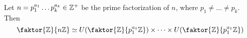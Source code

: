 \begin{corollary}
  Let $n=p_1^{a_1} \dots p_k^{a_k} \in \mathbb{Z}^+$ be the prime factorization of
  $n$, where  $p_1 \neq \dots \neq p_k$. Then
  \begin{equation*}
    \faktor{\Z}{n\Z} \simeq U(\faktor{\Z}{p_1^{a_1}\Z}) \times \dots \times
    U(\faktor{\Z}{p_1^{a_1}\Z})
  \end{equation*}
\end{corollary}
